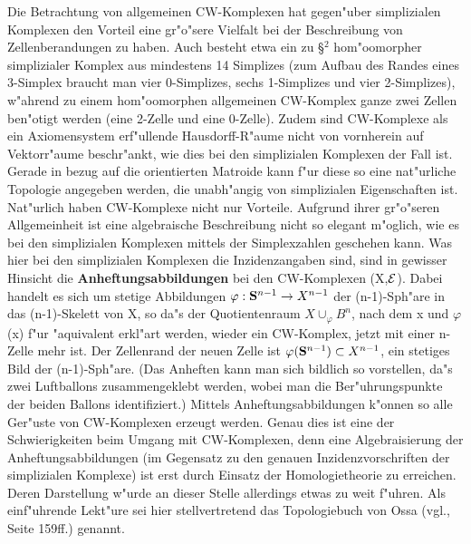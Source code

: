 Die Betrachtung von allgemeinen CW-Komplexen hat gegen"uber simplizialen
Komplexen den Vorteil eine gr"o"sere Vielfalt bei der Beschreibung von
Zellenberandungen zu haben. Auch besteht etwa ein zu \S$^2$ hom"oomorpher
simplizialer Komplex aus mindestens 14 Simplizes (zum Aufbau des Randes eines
3-Simplex braucht man vier 0-Simplizes, sechs 1-Simplizes und vier 2-Simplizes),
w"ahrend zu einem hom"oomorphen allgemeinen CW-Komplex ganze zwei Zellen
ben"otigt werden (eine 2-Zelle und eine 0-Zelle). Zudem sind CW-Komplexe als
ein Axiomensystem erf"ullende Hausdorff-R"aume nicht von vornherein auf
Vektorr"aume beschr"ankt, wie dies bei den simplizialen Komplexen der Fall ist.
Gerade in bezug auf die orientierten Matroide kann f"ur diese so eine
nat"urliche Topologie angegeben werden, die unabh"angig von simplizialen
Eigenschaften ist.\\
Nat"urlich haben CW-Komplexe nicht nur Vorteile. Aufgrund ihrer gr"o"seren
Allgemeinheit ist eine algebraische Beschreibung nicht so elegant
m"oglich, wie es bei den simplizialen Komplexen mittels der Simplexzahlen
geschehen kann. Was hier bei den simplizialen Komplexen die Inzidenzangaben
sind, sind in gewisser Hinsicht die {\bf Anheftungsabbildungen} bei den
CW-Komplexen (X,$\cal E$). Dabei handelt es sich um
 stetige Abbildungen
$\varphi:\S^{n-1}\to X^{n-1}$ der (n-1)-Sph"are in das (n-1)-Skelett von X, so
da"s der Quotientenraum $X\cup_{\varphi} B^n$, nach
dem x und $\varphi$(x) f"ur "aquivalent erkl"art werden, wieder ein CW-Komplex,
jetzt mit einer n-Zelle mehr ist. Der Zellenrand der neuen Zelle ist
$\varphi(\S^{n-1})\subset X^{n-1}$, ein stetiges Bild der (n-1)-Sph"are.
(Das Anheften kann man sich bildlich so vorstellen, da"s zwei Luftballons
zusammengeklebt werden, wobei man die Ber"uhrungspunkte der beiden Ballons
identifiziert.) Mittels Anheftungsabbildungen k"onnen so alle Ger"uste
von CW-Komplexen erzeugt werden. Genau dies ist eine der Schwierigkeiten beim
Umgang mit CW-Komplexen, denn eine Algebraisierung der Anheftungsabbildungen
(im Gegensatz zu den genauen Inzidenzvorschriften der simplizialen Komplexe) ist
erst durch Einsatz der Homologietheorie zu erreichen. Deren Darstellung w"urde
an dieser Stelle allerdings etwas zu weit f"uhren. Als einf"uhrende Lekt"ure sei
hier stellvertretend das Topologiebuch von Ossa (vgl.\cite{Os:92}, Seite 159ff.)
genannt.

